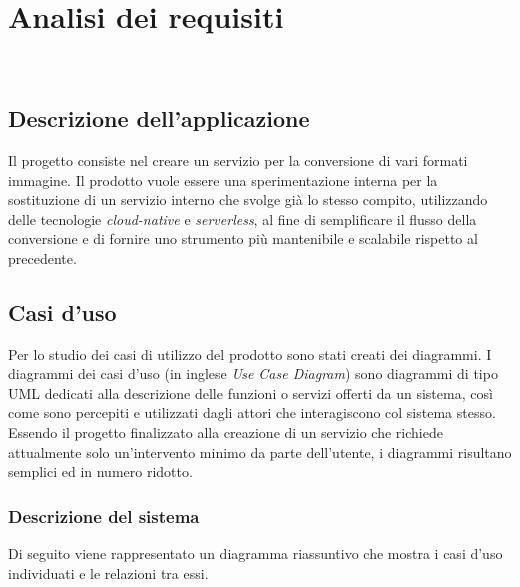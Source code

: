 
\chapter{Analisi dei requisiti}
\label{cap:analisi-requisiti}

\\

\section{Descrizione dell'applicazione}
Il progetto consiste nel creare un servizio per la
conversione di vari formati immagine. Il prodotto vuole essere una
sperimentazione interna per la sostituzione di un servizio interno che svolge
già lo stesso compito, utilizzando delle tecnologie \emph{cloud-native} e
\emph{serverless}, al fine di semplificare il flusso della conversione e di
fornire uno strumento più mantenibile e scalabile rispetto al precedente.\\


\section{Casi d'uso}

Per lo studio dei casi di utilizzo del prodotto sono stati creati dei diagrammi.
I diagrammi dei casi d'uso (in inglese \emph{Use Case Diagram}) sono diagrammi di tipo \gls{UML} dedicati
alla descrizione delle funzioni o servizi offerti da un sistema, così come sono
percepiti e utilizzati dagli attori che interagiscono col sistema stesso.
Essendo il progetto finalizzato alla creazione di un servizio che richiede
attualmente solo un'intervento minimo da parte dell'utente, i diagrammi risultano semplici ed in numero ridotto.

\subsection{Descrizione del sistema}
Di seguito viene rappresentato un diagramma riassuntivo che mostra i casi d'uso
individuati e le relazioni tra essi.

